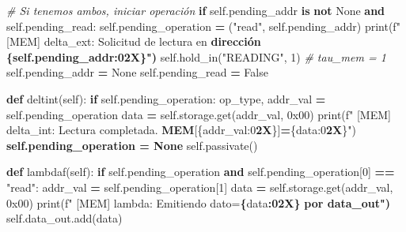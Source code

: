 \documentclass[12pt,oneside]{templates/unerthesis}
\newenvironment{Shaded}{\begin{snugshade}}{\end{snugshade}}
\newcommand{\BaseNTok}[1]{\textcolor[rgb]{0.00,0.00,0.81}{#1}}
\newcommand{\BuiltInTok}[1]{#1}
\newcommand{\CommentTok}[1]{\textcolor[rgb]{0.56,0.35,0.01}{\textit{#1}}}
\newcommand{\ControlFlowTok}[1]{\textcolor[rgb]{0.13,0.29,0.53}{\textbf{#1}}}
\newcommand{\DecValTok}[1]{\textcolor[rgb]{0.00,0.00,0.81}{#1}}
\newcommand{\ErrorTok}[1]{\textcolor[rgb]{0.64,0.00,0.00}{\textbf{#1}}}
\newcommand{\KeywordTok}[1]{\textcolor[rgb]{0.13,0.29,0.53}{\textbf{#1}}}
\newcommand{\NormalTok}[1]{#1}
\newcommand{\OperatorTok}[1]{\textcolor[rgb]{0.81,0.36,0.00}{\textbf{#1}}}
\newcommand{\SpecialCharTok}[1]{\textcolor[rgb]{0.81,0.36,0.00}{\textbf{#1}}}
\newcommand{\SpecialStringTok}[1]{\textcolor[rgb]{0.31,0.60,0.02}{#1}}
\newcommand{\StringTok}[1]{\textcolor[rgb]{0.31,0.60,0.02}{#1}}
\newcommand{\VariableTok}[1]{\textcolor[rgb]{0.00,0.00,0.00}{#1}}
\begin{document}
\begin{Shaded}
\begin{Highlighting}[]
        \CommentTok{\# Si tenemos ambos, iniciar operación}
        \ControlFlowTok{if} \VariableTok{self}\NormalTok{.pending\_addr }\KeywordTok{is} \KeywordTok{not} \VariableTok{None} \KeywordTok{and} \VariableTok{self}\NormalTok{.pending\_read:}
            \VariableTok{self}\NormalTok{.pending\_operation }\OperatorTok{=}\NormalTok{ (}\StringTok{"read"}\NormalTok{, }\VariableTok{self}\NormalTok{.pending\_addr)}
            \BuiltInTok{print}\NormalTok{(}\SpecialStringTok{f"  [MEM] delta\_ext: Solicitud de lectura en }
\ErrorTok{            dirección \{self.pending\_addr:02X\}")}
            \VariableTok{self}\NormalTok{.hold\_in(}\StringTok{"READING"}\NormalTok{, }\DecValTok{1}\NormalTok{)  }\CommentTok{\# tau\_mem = 1}
            \VariableTok{self}\NormalTok{.pending\_addr }\OperatorTok{=} \VariableTok{None}
            \VariableTok{self}\NormalTok{.pending\_read }\OperatorTok{=} \VariableTok{False}
    
    \KeywordTok{def}\NormalTok{ deltint(}\VariableTok{self}\NormalTok{):}
        \ControlFlowTok{if} \VariableTok{self}\NormalTok{.pending\_operation:}
\NormalTok{            op\_type, addr\_val }\OperatorTok{=} \VariableTok{self}\NormalTok{.pending\_operation}
\NormalTok{            data }\OperatorTok{=} \VariableTok{self}\NormalTok{.storage.get(addr\_val, }\BaseNTok{0x00}\NormalTok{)}
            \BuiltInTok{print}\NormalTok{(}\SpecialStringTok{f"  [MEM] delta\_int: Lectura completada. }
\ErrorTok{            MEM}\NormalTok{[\{addr\_val:}\DecValTok{0}\ErrorTok{2X}\NormalTok{\}]}\OperatorTok{=}\NormalTok{\{data:}\DecValTok{0}\ErrorTok{2X}\NormalTok{\}}\StringTok{")}
\ErrorTok{        self.pending\_operation = None}
        \VariableTok{self}\NormalTok{.passivate()}
    
    \KeywordTok{def}\NormalTok{ lambdaf(}\VariableTok{self}\NormalTok{):}
        \ControlFlowTok{if} \VariableTok{self}\NormalTok{.pending\_operation }\KeywordTok{and} \VariableTok{self}\NormalTok{.pending\_operation[}\DecValTok{0}\NormalTok{] }
        \OperatorTok{==} \StringTok{"read"}\NormalTok{:}
\NormalTok{            addr\_val }\OperatorTok{=} \VariableTok{self}\NormalTok{.pending\_operation[}\DecValTok{1}\NormalTok{]}
\NormalTok{            data }\OperatorTok{=} \VariableTok{self}\NormalTok{.storage.get(addr\_val, }\BaseNTok{0x00}\NormalTok{)}
            \BuiltInTok{print}\NormalTok{(}\SpecialStringTok{f"  [MEM] lambda: Emitiendo dato=}\SpecialCharTok{\{}\NormalTok{data}\SpecialCharTok{:02X\}}\SpecialStringTok{ }
\ErrorTok{            por data\_out")}
            \VariableTok{self}\NormalTok{.data\_out.add(data)}
    

\end{Highlighting}
\end{Shaded}
\end{document}
